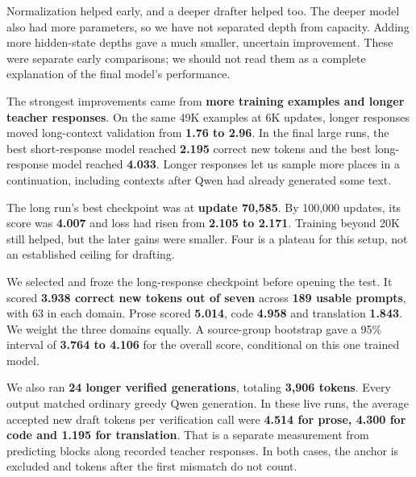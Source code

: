 \documentclass[11pt,a4paper]{article}
\begin{document}
\vspace{2mm}{\large\bfseries What made it work\par}

Normalization helped early, and a deeper drafter helped too. The deeper model also had more parameters, so we have not separated depth from capacity. Adding more hidden-state depths gave a much smaller, uncertain improvement. These were separate early comparisons; we should not read them as a complete explanation of the final model's performance.

The strongest improvements came from \textbf{more training examples and longer teacher responses}. On the same 49K examples at 6K updates, longer responses moved long-context validation from \textbf{1.76 to 2.96}. In the final large runs, the best short-response model reached \textbf{2.195} correct new tokens and the best long-response model reached \textbf{4.033}. Longer responses let us sample more places in a continuation, including contexts after Qwen had already generated some text.

The long run's best checkpoint was at \textbf{update 70,585}. By 100,000 updates, its score was \textbf{4.007} and loss had risen from \textbf{2.105 to 2.171}. Training beyond 20K still helped, but the later gains were smaller. Four is a plateau for this setup, not an established ceiling for drafting.

\vspace{2mm}{\large\bfseries What we actually validated\par}

We selected and froze the long-response checkpoint before opening the test. It scored \textbf{3.938 correct new tokens out of seven} across \textbf{189 usable prompts}, with 63 in each domain. Prose scored \textbf{5.014}, code \textbf{4.958} and translation \textbf{1.843}. We weight the three domains equally. A source-group bootstrap gave a 95\% interval of \textbf{3.764 to 4.106} for the overall score, conditional on this one trained model.

We also ran \textbf{24 longer verified generations}, totaling \textbf{3,906 tokens}. Every output matched ordinary greedy Qwen generation. In these live runs, the average accepted new draft tokens per verification call were \textbf{4.514 for prose, 4.300 for code and 1.195 for translation}. That is a separate measurement from predicting blocks along recorded teacher responses. In both cases, the anchor is excluded and tokens after the first mismatch do not count.
\end{document}
